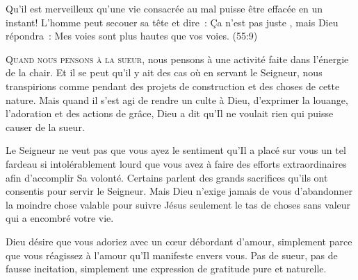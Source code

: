 Qu'il est merveilleux qu'une vie consacrée au mal puisse être effacée
 en un instant! L'homme peut secouer sa tête et dire~: 
 \og Ça n'est pas juste \fg{}, mais Dieu répondra~: 
 \og Mes voies sont plus hautes que vos voies. \fg{}
 (55:9)

\dvrule







\lettrine{Q}{uand nous pensons à la sueur,}
 nous pensons à une activité faite dans l'énergie de la chair.
 Et il se peut qu'il y ait des cas où en servant le Seigneur,
 nous transpirions \ocadr comme pendant des projets de construction
 et des choses de cette nature. Mais quand il s'est agi de rendre
 un culte à Dieu, d'exprimer la louange, l'adoration
 et des actions de grâce, Dieu a dit qu'Il ne voulait rien
 qui puisse causer de la sueur. 



Le Seigneur ne veut pas que vous ayez le sentiment qu'Il a placé sur vous
 un tel fardeau si intolérablement lourd que vous avez à faire des efforts
 extraordinaires afin d'accomplir Sa volonté. Certains parlent
 des grands sacrifices 
qu'ils ont consentis pour servir le Seigneur.
 Mais Dieu n'exige jamais de vous d'abandonner la moindre chose valable
 pour suivre Jésus \ocadr seulement le tas de choses sans valeur
 qui a encombré votre vie. 

Dieu désire que vous adoriez avec un cœur débordant d'amour,
 simplement parce que vous réagissez à l'amour qu'Il manifeste envers vous.
 Pas de sueur, pas de fausse incitation,
 simplement une expression de gratitude pure et naturelle. 

